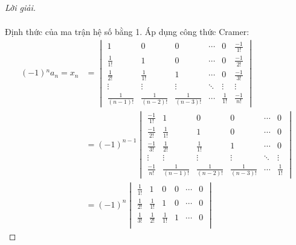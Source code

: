 \documentclass[class=linearalgebra,crop=false]{standalone}
\begin{document}
\begin{proof}[Lời giải]
\begin{align*}
    \end{align*}
    \par Định thức của ma trận hệ số bằng 1. Áp dụng công thức Cramer:
    \begin{align*}
        (-1){}^{n}a_{n} = x_{n}   & =
        \begin{vmatrix}
            1                & 0                & 0                & \cdots & 0            & \frac{-1}{1!} \\
            \frac{1}{1!}     & 1                & 0                & \cdots & 0            & \frac{-1}{2!} \\
            \frac{1}{2!}     & \frac{1}{1!}     & 1                & \cdots & 0            & \frac{-1}{3!} \\
            \vdots           & \vdots           & \vdots           & \ddots & \vdots       & \vdots        \\
            \frac{1}{(n-1)!} & \frac{1}{(n-2)!} & \frac{1}{(n-3)!} & \cdots & \frac{1}{1!} & \frac{-1}{n!}
        \end{vmatrix} \\
                                  & = (-1)^{n-1}
        \begin{vmatrix}
            \frac{-1}{1!} & 1                & 0                & 0                & \cdots & 0            \\
            \frac{-1}{2!} & \frac{1}{1!}     & 1                & 0                & \cdots & 0            \\
            \frac{-1}{3!} & \frac{1}{2!}     & \frac{1}{1!}     & 1                & \cdots & 0            \\
            \vdots        & \vdots           & \vdots           & \vdots           & \ddots & \vdots       \\
            \frac{-1}{n!} & \frac{1}{(n-1)!} & \frac{1}{(n-2)!} & \frac{1}{(n-3)!} & \cdots & \frac{1}{1!}
        \end{vmatrix} \\
                                  & = (-1)^{n}
        \begin{vmatrix}
            \frac{1}{1!} & 1                & 0                & 0                & \cdots & 0            \\
            \frac{1}{2!} & \frac{1}{1!}     & 1                & 0                & \cdots & 0            \\
            \frac{1}{3!} & \frac{1}{2!}     & \frac{1}{1!}     & 1                & \cdots & 0            \\

\end{vmatrix}
\end{align*}
\end{proof}
\end{document}
